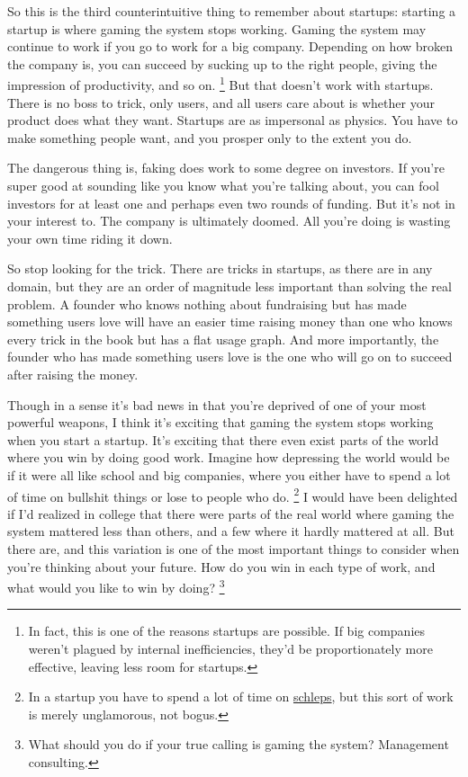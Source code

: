 \documentclass[12pt]{book}
\begin{document}
So this is the third counterintuitive thing to remember about startups:
starting a startup is where gaming the system stops working. Gaming the
system may continue to work if you go to work for a big company.
Depending on how broken the company is, you can succeed by sucking up to
the right people, giving the impression of productivity, and so on.
\footnote{In fact, this is one of the reasons startups are possible. If
big companies weren't plagued by internal inefficiencies, they'd be
proportionately more effective, leaving less room for startups.} But that doesn't work with startups. There is no
boss to trick, only users, and all users care about is whether your
product does what they want. Startups are as impersonal as physics. You
have to make something people want, and you prosper only to the extent
you do.

The dangerous thing is, faking does work to some degree on investors. If
you're super good at sounding like you know what you're talking about,
you can fool investors for at least one and perhaps even two rounds of
funding. But it's not in your interest to. The company is ultimately
doomed. All you're doing is wasting your own time riding it down.

So stop looking for the trick. There are tricks in startups, as there
are in any domain, but they are an order of magnitude less important
than solving the real problem. A founder who knows nothing about
fundraising but has made something users love will have an easier time
raising money than one who knows every trick in the book but has a flat
usage graph. And more importantly, the founder who has made something
users love is the one who will go on to succeed after raising the money.

Though in a sense it's bad news in that you're deprived of one of your
most powerful weapons, I think it's exciting that gaming the system
stops working when you start a startup. It's exciting that there even
exist parts of the world where you win by doing good work. Imagine how
depressing the world would be if it were all like school and big
companies, where you either have to spend a lot of time on bullshit
things or lose to people who do. \footnote{In a startup you have to spend a lot of time on
\href{schlep.html}{schleps}, but this sort of work is merely
unglamorous, not bogus.} I would have
been delighted if I'd realized in college that there were parts of the
real world where gaming the system mattered less than others, and a few
where it hardly mattered at all. But there are, and this variation is
one of the most important things to consider when you're thinking about
your future. How do you win in each type of work, and what would you
like to win by doing? \footnote{What should you do if your true calling is gaming the system?
Management consulting.}
\end{document}
